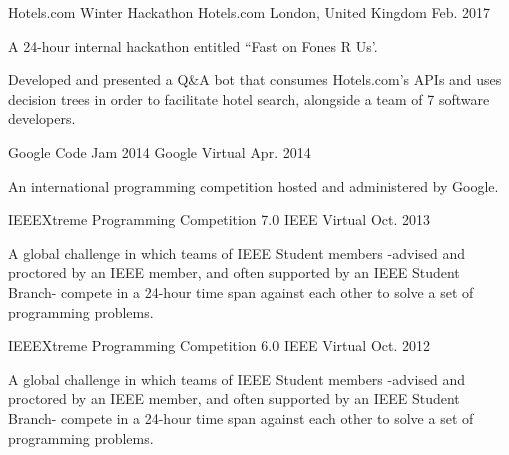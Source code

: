 

\begin{cventries}

  \cventry
    {Hotels.com Winter Hackathon} %
    {Hotels.com} %
    {London, United Kingdom} %
    {Feb. 2017} %
    {
      \begin{cvitems} %
        \item {A 24-hour internal hackathon entitled ``Fast on Fones R Us'.}
        \item {Developed and presented a Q\&A bot that consumes Hotels.com's APIs and uses decision trees in order to facilitate hotel search, alongside a team of 7 software developers.}
      \end{cvitems}
    }  
  
  \cventry
    {Google Code Jam 2014} %
    {Google} %
    {Virtual} %
    {Apr. 2014} %
    {
      \begin{cvitems} %
        \item {An international programming competition hosted and administered by Google.}
      \end{cvitems}
    }  
  
  \cventry
    {IEEEXtreme Programming Competition 7.0} %
    {IEEE} %
    {Virtual} %
    {Oct. 2013} %
    {
      \begin{cvitems} %
        \item {A global challenge in which teams of IEEE Student members -advised and proctored by an IEEE member, and often supported by an IEEE Student Branch- compete in a 24-hour time span against each other to solve a set of programming problems.}
      \end{cvitems}
    }
    
  \cventry
    {IEEEXtreme Programming Competition 6.0} %
    {IEEE} %
    {Virtual} %
    {Oct. 2012} %
    {
      \begin{cvitems} %
        \item {A global challenge in which teams of IEEE Student members -advised and proctored by an IEEE member, and often supported by an IEEE Student Branch- compete in a 24-hour time span against each other to solve a set of programming problems.}
      \end{cvitems}
    }


\end{cventries}
